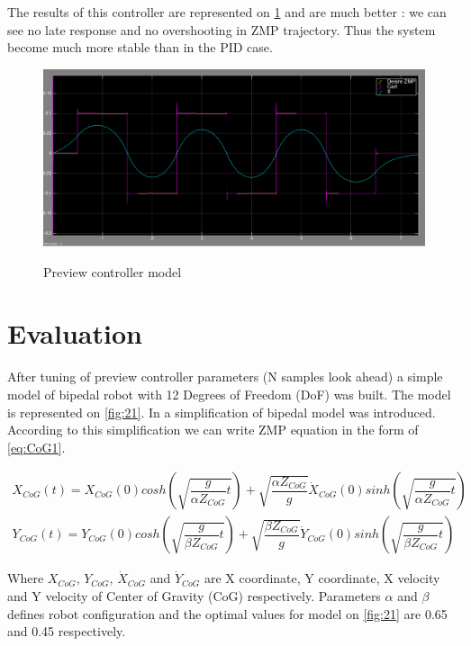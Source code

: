 \documentclass[12pt,a4paper]{report}
\begin{document}
		The results of this controller are represented on \cref{fig:19} and are much better : we can see no late response and no overshooting in ZMP trajectory. Thus the system become much more stable than in the PID case. 
		
		\begin{figure}[h!]
			\vspace{-0.2cm}
			\centering
 			{\includegraphics[width=1\textwidth]{19}}
			\caption{Preview controller model}
			\label{fig:19}
			\vspace{-0.1cm}
		\end{figure}
		
	\chapter{Evaluation}
		After tuning of preview controller parameters (N samples look ahead) a simple model of bipedal robot with 12 Degrees of Freedom (DoF) was built. The model is represented on \cref{fig:21}. In \cite{ha2007effective} a simplification of bipedal model was introduced. According to this simplification we can write ZMP equation in the form of \ref{eq:CoG1}.
		
		\begin{equation}\label{eq:CoG1}
			\begin{split}
				X_{CoG}(t) = X_{CoG}(0) cosh(\sqrt{\dfrac{g}{\alpha Z_{CoG}} t}) + \sqrt{\dfrac{\alpha Z_{CoG}}{g}} \dot{X}_{CoG}(0) sinh(\sqrt{\dfrac{g}{\alpha Z_{CoG}} t})\\
				Y_{CoG}(t) = Y_{CoG}(0) cosh(\sqrt{\dfrac{g}{\beta Z_{CoG}} t}) + \sqrt{\dfrac{\beta Z_{CoG}}{g}} \dot{Y}_{CoG}(0) sinh(\sqrt{\dfrac{g}{\beta Z_{CoG}} t})
			\end{split}
		\end{equation}
		
		Where $X_{CoG}$, $Y_{CoG}$, $\dot{X}_{CoG}$ and $\dot{Y}_{CoG}$ are X coordinate, Y coordinate, X velocity and Y velocity of Center of Gravity (CoG) respectively. Parameters $\alpha$ and $\beta$ defines robot configuration and the optimal values for model on \cref{fig:21} are 0.65 and 0.45 respectively.
		
\end{document}
